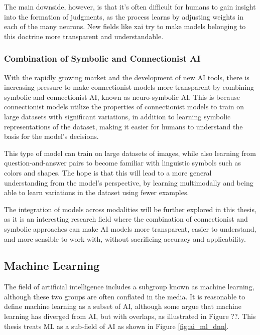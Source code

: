 The main downside, however, is that it's often difficult for humans to gain insight into the formation of judgments, as the process learns by adjusting weights in each of the many neurons. New fields like \gls{xai} try to make models belonging to this doctrine more transparent and understandable.


\subsubsection{Combination of Symbolic and Connectionist AI}
With the rapidly growing market and the development of new AI tools, there is increasing pressure to make connectionist models more transparent by combining symbolic and connectionist AI, known as neuro-symbolic AI. This is because connectionist models utilize the properties of connectionist models to train on large datasets with significant variations, in addition to learning symbolic representations of the dataset, making it easier for humans to understand the basis for the model's decisions.

This type of model can train on large datasets of images, while also learning from question-and-answer pairs to become familiar with linguistic symbols such as colors and shapes. The hope is that this will lead to a more general understanding from the model's perspective, by learning multimodally and being able to learn variations in the dataset using fewer examples.

The integration of models across modalities will be further explored in this thesis, as it is an interesting research field where the combination of connectionist and symbolic approaches can make AI models more transparent, easier to understand, and more sensible to work with, without sacrificing accuracy and applicability.


    \subsection{Machine Learning}

    The field of artificial intelligence includes a subgroup known as machine learning, although these two groups are often conflated in the media. It is reasonable to define machine learning as a subset of AI, although some argue that machine learning has diverged from AI, but with overlaps, as illustrated in Figure ??. This thesis treats ML as a sub-field of AI as shown in Figure \ref{fig:ai_ml_dnn}.

